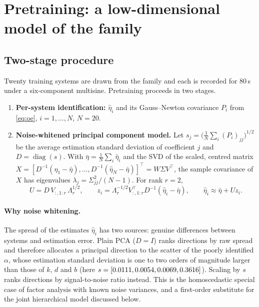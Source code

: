 \documentclass[11pt,a4paper]{article}
\newcommand{\etab}{\bar\eta}
\begin{document}
\section{Pretraining: a low-dimensional model of the family}\label{sec:pretrain}

\subsection{Two-stage procedure}
Twenty training systems are drawn from the family and each is recorded for 80\,s under a
six-component multisine. Pretraining proceeds in two stages.
\begin{enumerate}
  \item \textbf{Per-system identification:} $\hat\eta_i$ and its Gauss--Newton covariance $P_i$
  from \eqref{eq:oe}, $i=1,\dots,N$, $N=20$.
  \item \textbf{Noise-whitened principal component model.} Let $s_j=\big(\frac1N\sum_i (P_i)_{jj}\big)^{1/2}$
  be the average estimation standard deviation of coefficient $j$ and $D=\operatorname{diag}(s)$.
  With $\etab=\frac1N\sum_i\hat\eta_i$ and the SVD of the scaled, centred matrix
  $X=[D^{-1}(\hat\eta_1-\etab),\dots,D^{-1}(\hat\eta_N-\etab)]^\top = W\Sigma V^\top$, the sample
  covariance of $X$ has eigenvalues $\lambda_j=\Sigma_{jj}^2/(N-1)$. For rank $r=2$,
  \begin{equation}\label{eq:pca}
    U = D\,V_{:,1:r}\,\Lambda_r^{1/2},\qquad z_i = \Lambda_r^{-1/2}V_{:,1:r}^\top D^{-1}(\hat\eta_i-\etab),\qquad
    \hat\eta_i\approx\etab + U z_i .
  \end{equation}
\end{enumerate}

\paragraph{Why noise whitening.} The spread of the estimates $\hat\eta_i$ has two sources:
genuine differences between systems and estimation error. Plain PCA ($D=I$) ranks directions by raw
spread and therefore allocates a principal direction to the scatter of the poorly identified
$\alpha$, whose estimation standard deviation is one to two orders of magnitude larger than those of
$k$, $d$ and $b$ (here $s=[0.0111, 0.0054, 0.0069, 0.3616]$). Scaling by $s$ ranks directions by
signal-to-noise ratio instead. This is the homoscedastic special case of factor analysis with known
noise variances, and a first-order substitute for the joint hierarchical model discussed below.
\end{document}
